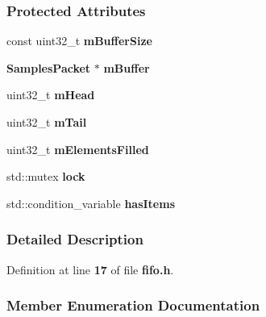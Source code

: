 \subsubsection*{Protected Attributes}
\begin{DoxyCompactItemize}
\item 
const uint32\+\_\+t {\bf m\+Buffer\+Size}
\item 
{\bf Samples\+Packet} $\ast$ {\bf m\+Buffer}
\item 
uint32\+\_\+t {\bf m\+Head}
\item 
uint32\+\_\+t {\bf m\+Tail}
\item 
uint32\+\_\+t {\bf m\+Elements\+Filled}
\item 
std\+::mutex {\bf lock}
\item 
std\+::condition\+\_\+variable {\bf has\+Items}
\end{DoxyCompactItemize}


\subsubsection{Detailed Description}


Definition at line {\bf 17} of file {\bf fifo.\+h}.



\subsubsection{Member Enumeration Documentation}
